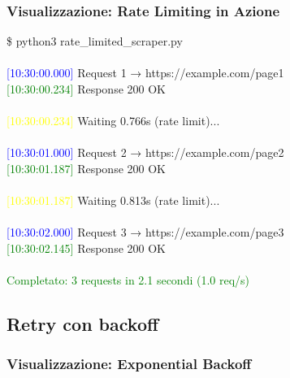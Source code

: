 \subsubsection{Visualizzazione: Rate Limiting in Azione}

\begin{center}
\begin{tcolorbox}[title=Terminal Output: Rate limiting (1 req/s), colback=black!5, coltitle=white, colbacktitle=red!50!black, width=0.95\textwidth, fonttitle=\bfseries\ttfamily, fontupper=\small\ttfamily]
\$ python3 rate\_limited\_scraper.py\\
\\
\textcolor{blue}{[10:30:00.000]} Request 1 → https://example.com/page1\\
\textcolor{green}{[10:30:00.234]} Response 200 OK\\
\\
\textcolor{yellow}{[10:30:00.234]} Waiting 0.766s (rate limit)...\\
\\
\textcolor{blue}{[10:30:01.000]} Request 2 → https://example.com/page2\\
\textcolor{green}{[10:30:01.187]} Response 200 OK\\
\\
\textcolor{yellow}{[10:30:01.187]} Waiting 0.813s (rate limit)...\\
\\
\textcolor{blue}{[10:30:02.000]} Request 3 → https://example.com/page3\\
\textcolor{green}{[10:30:02.145]} Response 200 OK\\
\\
\textcolor{green}{Completato: 3 requests in 2.1 secondi (1.0 req/s)}
\end{tcolorbox}
\end{center}

\subsection{Retry con backoff}

\subsubsection{Visualizzazione: Exponential Backoff}

